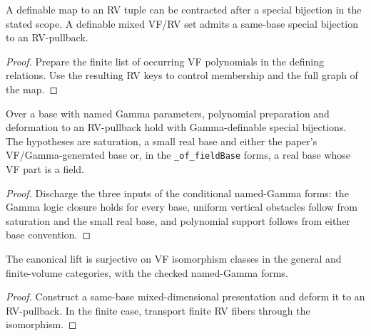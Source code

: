 \begin{theorem}
\label{thm:deformation}
\leanok
A definable map to an RV tuple can be contracted after a special
bijection in the stated scope. A definable mixed VF/RV set admits a
same-base special bijection to an RV-pullback.
\end{theorem}
\begin{proof}
\leanok
{}
Prepare the finite list of occurring VF polynomials in the defining
relations. Use the resulting RV keys to control membership and the
full graph of the map.
\end{proof}

\begin{theorem}
\label{thm:gamma-preparation}
\leanok
Over a base with named Gamma parameters, polynomial preparation and
deformation to an RV-pullback hold with Gamma-definable special
bijections. The hypotheses are saturation, a small real base and
either the paper's VF/Gamma-generated base or, in the
\texttt{\_of\_fieldBase} forms, a real base whose VF part is a field.
\end{theorem}
\begin{proof}
\leanok
{}
Discharge the three inputs of the conditional named-Gamma forms: the
Gamma logic closure holds for every base, uniform vertical obstacles
follow from saturation and the small real base, and polynomial support
follows from either base convention.
\end{proof}

\begin{corollary}
\label{cor:object-surjectivity}
\leanok
The canonical lift is surjective on VF isomorphism classes in the
general and finite-volume categories, with the checked named-Gamma
forms.
\end{corollary}
\begin{proof}
\leanok
{}
Construct a same-base mixed-dimensional presentation and deform it
to an RV-pullback. In the finite case, transport finite RV fibers
through the isomorphism.
\end{proof}


